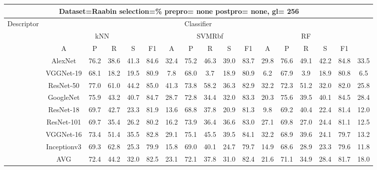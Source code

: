 \documentclass[12pt,italian]{article}
\begin{document}
\begin{tiny}
\begin{longtable}{lcccccccccccccccc}
\toprule
\multicolumn{16}{c}{Dataset=Raabin selection=\% prepro= none postpro= none, gl= 256} \\ 
\toprule
Descriptor & \multicolumn{15}{c}{Classifier} \\ 
& \multicolumn{5}{c}{kNN} & \multicolumn{5}{c}{SVMRbf} & \multicolumn{5}{c}{RF} \\ 
& A & P & R & S & F1 & A & P & R & S & F1 & A & P & R & S & F1 \\ 
\midrule
& AlexNet & 76.2 & 38.6 & 41.3 & 84.6 & 32.4 & 75.2 & 46.3 & 39.0 & 83.7 & 29.8 & 76.6 & 49.1 & 42.2 & 84.8 & 33.5 \\ 
& VGGNet-19 & 68.1 & 18.2 & 19.5 & 80.9 &  7.8 & 68.0 &  3.7 & 18.9 & 80.9 &  6.2 & 67.9 &  3.9 & 18.9 & 80.8 &  6.5 \\ 
& ResNet-50 & 77.0 & 61.0 & 44.2 & 85.0 & 41.3 & 73.8 & 58.2 & 36.3 & 82.9 & 32.2 & 72.3 & 51.2 & 32.0 & 82.0 & 25.8 \\ 
& GoogleNet & 75.9 & 43.2 & 40.7 & 84.7 & 28.7 & 72.8 & 34.4 & 32.0 & 83.3 & 20.3 & 75.6 & 39.5 & 40.1 & 84.5 & 28.4 \\ 
& ResNet-18 & 69.7 & 42.7 & 23.3 & 81.9 & 13.6 & 68.8 & 37.8 & 20.9 & 81.3 &  9.8 & 69.2 & 40.4 & 22.4 & 81.4 & 12.0 \\ 
& ResNet-101 & 69.7 & 35.4 & 26.2 & 80.2 & 16.2 & 73.9 & 36.4 & 36.6 & 83.0 & 27.1 & 69.8 & 27.0 & 24.4 & 81.1 & 12.5 \\ 
& VGGNet-16 & 73.4 & 51.4 & 35.5 & 82.8 & 29.1 & 75.1 & 45.5 & 39.5 & 84.1 & 32.2 & 68.9 & 39.6 & 24.1 & 79.7 & 13.2 \\ 
& Inceptionv3 & 69.3 & 62.8 & 25.3 & 79.9 & 15.8 & 69.0 & 40.1 & 24.7 & 79.7 & 14.9 & 68.6 & 28.9 & 23.3 & 79.6 & 11.8 \\ 
\hline
& AVG & 72.4 & 44.2 & 32.0 & 82.5 & 23.1 & 72.1 & 37.8 & 31.0 & 82.4 & 21.6 & 71.1 & 34.9 & 28.4 & 81.7 & 18.0 \\ 
\hline
\bottomrule
\end{longtable} 

 \pagebreak 
\end{tiny} 
 
\end{document}
